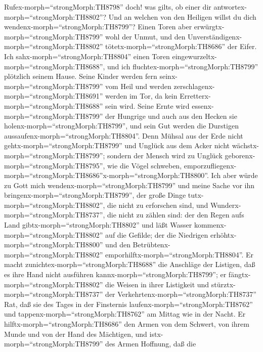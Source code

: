  Rufex-morph=``strongMorph:TH8798'' doch! was gilts, ob
einer dir antwortex-morph=``strongMorph:TH8802''? Und an welchen von den
Heiligen willst du dich wendenx-morph=``strongMorph:TH8799''?
 Einen Toren aber erwürgtx-morph=``strongMorph:TH8799'' wohl
der Unmut, und den Unverständigenx-morph=``strongMorph:TH8802''
tötetx-morph=``strongMorph:TH8686'' der Eifer.  Ich
sahx-morph=``strongMorph:TH8804'' einen Toren
eingewurzeltx-morph=``strongMorph:TH8688'', und ich
fluchtex-morph=``strongMorph:TH8799'' plötzlich seinem Hause.
 Seine Kinder werden fern seinx-morph=``strongMorph:TH8799''
vom Heil und werden zerschlagenx-morph=``strongMorph:TH8691'' werden im
Tor, da kein Erretterx-morph=``strongMorph:TH8688'' sein wird.
 Seine Ernte wird essenx-morph=``strongMorph:TH8799'' der
Hungrige und auch aus den Hecken sie
holenx-morph=``strongMorph:TH8799'', und sein Gut werden die Durstigen
aussaufenx-morph=``strongMorph:TH8804''.  Denn Mühsal aus
der Erde nicht gehtx-morph=``strongMorph:TH8799'' und Unglück aus dem
Acker nicht wächstx-morph=``strongMorph:TH8799'';  sondern
der Mensch wird zu Unglück geborenx-morph=``strongMorph:TH8795'', wie
die Vögel schweben,
emporzufliegenx-morph=``strongMorph:TH8686''x-morph=``strongMorph:TH8800''.
 Ich aber würde zu Gott mich
wendenx-morph=``strongMorph:TH8799'' und meine Sache vor ihn
bringenx-morph=``strongMorph:TH8799'',  der große Dinge
tutx-morph=``strongMorph:TH8802'', die nicht zu erforschen sind, und
Wunderx-morph=``strongMorph:TH8737'', die nicht zu zählen sind:
 der den Regen aufs Land gibtx-morph=``strongMorph:TH8802''
und läßt Wasser kommenx-morph=``strongMorph:TH8802'' auf die Gefilde;
 der die Niedrigen erhöhtx-morph=``strongMorph:TH8800'' und
den Betrübtenx-morph=``strongMorph:TH8802''
emporhilftx-morph=``strongMorph:TH8804''.  Er macht
zunichtex-morph=``strongMorph:TH8688'' die Anschläge der Listigen, daß
es ihre Hand nicht ausführen kannx-morph=``strongMorph:TH8799'';
 er fängtx-morph=``strongMorph:TH8802'' die Weisen in ihrer
Listigkeit und stürztx-morph=``strongMorph:TH8737'' der
Verkehrtenx-morph=``strongMorph:TH8737'' Rat,  daß sie des
Tages in der Finsternis laufenx-morph=``strongMorph:TH8762'' und
tappenx-morph=``strongMorph:TH8762'' am Mittag wie in der Nacht.
 Er hilftx-morph=``strongMorph:TH8686'' den Armen von dem
Schwert, von ihrem Munde und von der Hand des Mächtigen, 
und istx-morph=``strongMorph:TH8799'' des Armen Hoffnung, daß die
